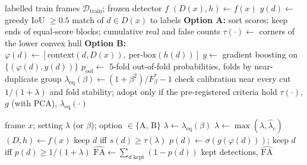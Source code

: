 \documentclass[11pt]{article}
\begin{document}
\begin{algorithm}[H]
\caption{Fitting the dial (offline, BDD100K train only)}\label{alg:fit}
\begin{algorithmic}[1]
\Require labelled train frames $\mathcal{D}_{\text{train}}$; frozen detector $f$
  \State $(D(x), h) \gets f(x)$ 
  \State $y(d) \gets$ greedy IoU $\ge 0.5$ match of $d \in D(x)$ to labels 
\EndFor
\State \textbf{Option A:} sort scores; keep ends of equal-score blocks; cumulative real and false counts
\State \hspace{1.2em} $\tau(\cdot) \gets$ corners of the lower convex hull 
\State \textbf{Option B:} $\varphi(d) \gets [\text{context}(d, D(x)),\ \text{per-box}(h(d))]$ 
\State \hspace{1.2em} $g \gets$ gradient boosting on $\{(\varphi(d), y(d))\}$ 
\State \hspace{1.2em} $p_{\text{oof}} \gets$ 5-fold out-of-fold probabilities, folds by near-duplicate group
\ForAll{$\beta$}
  \State $\lambda_{\text{eq}}(\beta) \gets (1+\beta^2)/F^*_\beta - 1$ 
\EndFor
\State check calibration near every cut $1/(1+\lambda)$ and fold stability; adopt only if the pre-registered criteria hold
\State \Return $\tau(\cdot)$, $g$ (with PCA), $\lambda_{\text{eq}}(\cdot)$
\end{algorithmic}
\end{algorithm}
\clearpage
\begin{algorithm}[H]
\caption{Applying the dial (online, every camera frame)}\label{alg:deploy}
\begin{algorithmic}[1]
\Require frame $x$; setting $\lambda$ (or $\beta$); option $\in\{$A, B$\}$
 \State $\lambda \gets \lambda_{\text{eq}}(\beta)$  \EndIf
{} \State $\lambda \gets \max(\lambda, \hat\lambda_c)$  \EndIf
\State $(D, h) \gets f(x)$ 
    \State keep $d$ iff $s(d) \ge \tau(\lambda)$
  \Else
    \State $p(d) \gets \sigma(g(\varphi(d)))$; keep $d$ iff $p(d) \ge 1/(1+\lambda)$ 
  \EndIf
\EndFor
\State $\widehat{\mathrm{FA}} \gets \sum_{d \text{ kept}} (1 - p(d))$ 
\State \Return kept detections, $\widehat{\mathrm{FA}}$
\end{algorithmic}
\end{algorithm}
\end{document}
